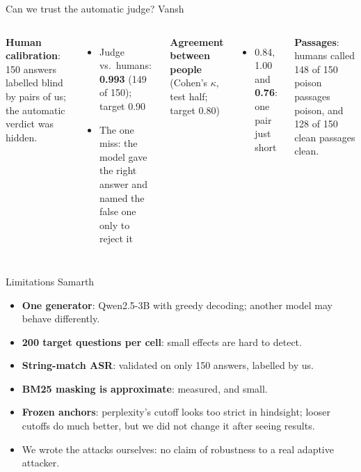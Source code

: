 \documentclass[aspectratio=169,11pt]{beamer}
\newcommand{\who}[1]{\hfill{\normalsize\color{muted}\textmd{#1}}}
\newcommand{\hl}[1]{{\color{accent}\textbf{#1}}}
\newcommand{\ok}[1]{{\color{good}\textbf{#1}}}
\begin{document}
\begin{frame}[t]{Can we trust the automatic judge? \who{Vansh}}
\begin{columns}[T]
\textbf{Human calibration}: 150 answers labelled blind by pairs of us; the automatic verdict was hidden.
\vspace{0.15cm}

\begin{itemize}
\item Judge vs.\ humans: \ok{0.993} (149 of 150); target 0.90
\item The one miss: the model gave the right answer and named the false one only to reject it
\end{itemize}
\textbf{Agreement between people} (Cohen's $\kappa$, test half; target 0.80)
\begin{itemize}
\item 0.84, 1.00 and \hl{0.76}: one pair just short
\end{itemize}
\vspace{0.1cm}
\textbf{Passages}: humans called 148 of 150 poison passages poison, and 128 of 150 clean passages clean.
\end{columns}
\end{frame}

\begin{frame}[t]{Limitations \who{Samarth}}
\begin{itemize}
\item \textbf{One generator}: Qwen2.5-3B with greedy decoding; another model may behave differently.
\item \textbf{200 target questions per cell}: small effects are hard to detect.
\item \textbf{String-match ASR}: validated on only 150 answers, labelled by us.
\item \textbf{BM25 masking is approximate}: measured, and small.
\item \textbf{Frozen anchors}: perplexity's cutoff looks too strict in hindsight; looser cutoffs do much better, but we
  did not change it after seeing results.
\item We wrote the attacks ourselves: no claim of robustness to a real adaptive attacker.
\end{itemize}
\end{frame}
\end{document}
